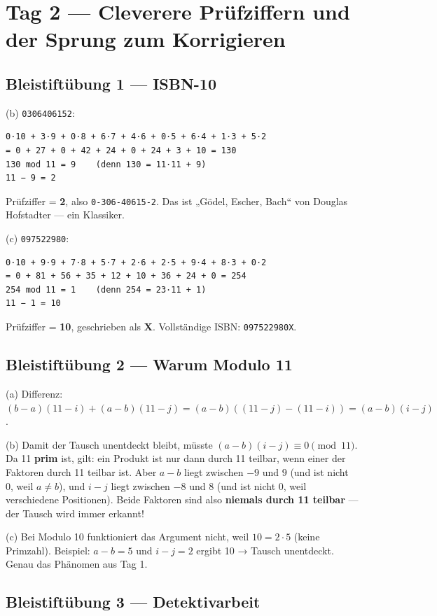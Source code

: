 \section{Tag 2 — Cleverere Prüfziffern und der Sprung zum Korrigieren}

\subsection*{Bleistiftübung 1 — ISBN-10}

(b) \texttt{0306406152}:
\begin{verbatim}
0·10 + 3·9 + 0·8 + 6·7 + 4·6 + 0·5 + 6·4 + 1·3 + 5·2
= 0 + 27 + 0 + 42 + 24 + 0 + 24 + 3 + 10 = 130
130 mod 11 = 9    (denn 130 = 11·11 + 9)
11 − 9 = 2
\end{verbatim}
Prüfziffer = \textbf{2}, also \texttt{0-306-40615-2}. Das ist „Gödel,
Escher, Bach“ von Douglas Hofstadter — ein Klassiker.

(c) \texttt{097522980}:
\begin{verbatim}
0·10 + 9·9 + 7·8 + 5·7 + 2·6 + 2·5 + 9·4 + 8·3 + 0·2
= 0 + 81 + 56 + 35 + 12 + 10 + 36 + 24 + 0 = 254
254 mod 11 = 1    (denn 254 = 23·11 + 1)
11 − 1 = 10
\end{verbatim}
Prüfziffer = \textbf{10}, geschrieben als \textbf{X}. Vollständige
ISBN: \texttt{097522980X}.

\subsection*{Bleistiftübung 2 — Warum Modulo 11}

(a) Differenz: $(b - a)(11 - i) + (a - b)(11 - j) = (a - b)((11-j) -
(11-i)) = (a - b)(i - j)$.

(b) Damit der Tausch unentdeckt bleibt, müsste $(a - b)(i - j) \equiv
0 \pmod{11}$. Da 11 \textbf{prim} ist, gilt: ein Produkt ist nur dann
durch 11 teilbar, wenn einer der Faktoren durch 11 teilbar ist. Aber
$a - b$ liegt zwischen $-9$ und $9$ (und ist nicht 0, weil $a \ne b$),
und $i - j$ liegt zwischen $-8$ und $8$ (und ist nicht 0, weil
verschiedene Positionen). Beide Faktoren sind also \textbf{niemals
durch 11 teilbar} — der Tausch wird immer erkannt!

(c) Bei Modulo 10 funktioniert das Argument nicht, weil $10 = 2 \cdot
5$ (keine Primzahl). Beispiel: $a-b = 5$ und $i-j = 2$ ergibt 10 →
Tausch unentdeckt. Genau das Phänomen aus Tag 1.

\subsection*{Bleistiftübung 3 — Detektivarbeit}

